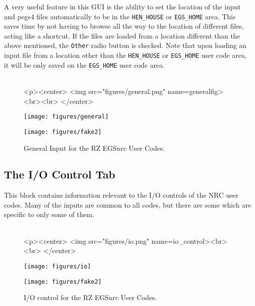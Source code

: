 \documentclass[12pt,twoside]{article}   %
\begin{document}
A very useful feature in this GUI is the ability to set the location of the input and
pegs4 files automatically to be in the {\tt HEN\_HOUSE} or {\tt EGS\_HOME} area. This saves
time by not having to browse all the way to the location of different files, acting like
a shortcut. If the files are loaded from a location different than the above
mentioned, the {\tt Other} radio button is checked. Note that upon loading an input file
from a location other than the {\tt HEN\_HOUSE} or {\tt EGS\_HOME} user code area, it will
be only saved on the {\tt EGS\_HOME} user code area. \\ \\
\begin{figure}[htb]
\begin{htmlonly}
\begin{rawhtml}
<p><center>
<img src="figures/general.png" name=generalfig><br><br>
</center>
\end{rawhtml}
\end{htmlonly}
\begin{latexonly}
\begin{center}
\texttt{[image: figures/general]}
\end{center}
\end{latexonly}
\begin{center}
\texttt{[image: figures/fake2]}
\end{center}
\caption{General Input for the RZ EGSnrc User Codes.}
\label{generalfig}
\end{figure}

\newpage
\subsection{The I/O Control Tab}
\label{io}

This block contains information relevant to the I/O controls of the NRC user codes.
Many of the inputs are common to all codes, but there are some which are specific to
only some of them. \\ \\
\begin{figure}[htb]
\begin{htmlonly}
\begin{rawhtml}
<p><center>
<img src="figures/io.png" name=io_control><br><br>
</center>
\end{rawhtml}
\end{htmlonly}
\begin{latexonly}
\begin{center}
\texttt{[image: figures/io]}
\end{center}
\end{latexonly}
\begin{center}
\texttt{[image: figures/fake2]}
\end{center}
\caption{I/O control for the RZ EGSnrc User Codes.}
\label{io_control}
\end{figure}
\end{document}

